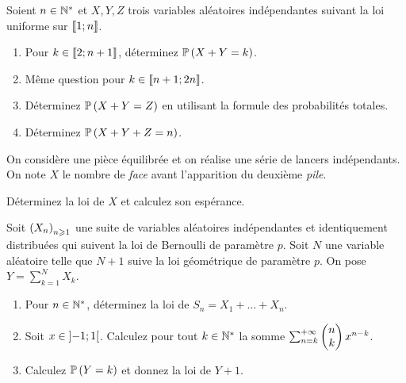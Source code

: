 \begin{exo}
Soient \(n\in\Ns\) et \(X,Y,Z\) trois variables aléatoires indépendantes suivant la loi uniforme sur \(\interventierii{1}{n}\).

\begin{enumerate}
    \item Pour \(k\in\interventierii{2}{n+1}\), déterminez \(\proba{X+Y=k}\). \\
    \item Même question pour \(k\in\interventierii{n+1}{2n}\). \\
    \item Déterminez \(\proba{X+Y=Z}\) en utilisant la formule des probabilités totales. \\
    \item Déterminez \(\proba{X+Y+Z=n}\).
\end{enumerate}
\end{exo}

\begin{exo}
On considère une pièce équilibrée et on réalise une série de lancers indépendants. On note \(X\) le nombre de \textit{face} avant l'apparition du deuxième \textit{pile}.

Déterminez la loi de \(X\) et calculez son espérance.
\end{exo}

\begin{exo}
Soit \(\paren{X_n}_{n\geq1}\) une suite de variables aléatoires indépendantes et identiquement distribuées qui suivent la loi de Bernoulli de paramètre \(p\). Soit \(N\) une variable aléatoire telle que \(N+1\) suive la loi géométrique de paramètre \(p\). On pose \(Y=\sum_{k=1}^NX_k\).

\begin{enumerate}
    \item Pour \(n\in\Ns\), déterminez la loi de \(S_n=X_1+\dots+X_n\). \\
    \item Soit \(x\in\intervee{-1}{1}\). Calculez pour tout \(k\in\Ns\) la somme \(\sum_{n=k}^{\pinf}\binom{k}{n}x^{n-k}\). \\
    \item Calculez \(\proba{Y=k}\) et donnez la loi de \(Y+1\).
\end{enumerate}
\end{exo}

